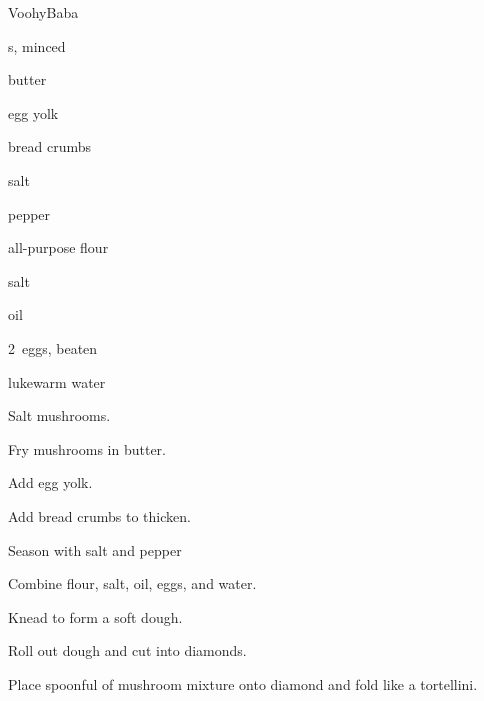 \begin{recipe}{Voohy}{Baba}{}

\begin{ingredients}
\item {}s, minced
\item butter
\item egg yolk
\item bread crumbs
\item salt
\item pepper

\item {} all-purpose flour
\item \tp{1\half} salt
\item {} oil
\item 2~eggs, beaten
\item \C{1\half} lukewarm water
\end{ingredients}

\begin{directions}
\item Salt mushrooms.
\item Fry mushrooms in butter.
\item Add egg yolk.
\item Add bread crumbs to thicken.
\item Season with salt and pepper
\item Combine flour, \tp{1\half} salt, oil, eggs, and water.
\item Knead to form a soft dough.
\item Roll out dough and cut into diamonds.
\item Place spoonful of mushroom mixture onto diamond and fold like a tortellini.
\end{directions}

\end{recipe}
